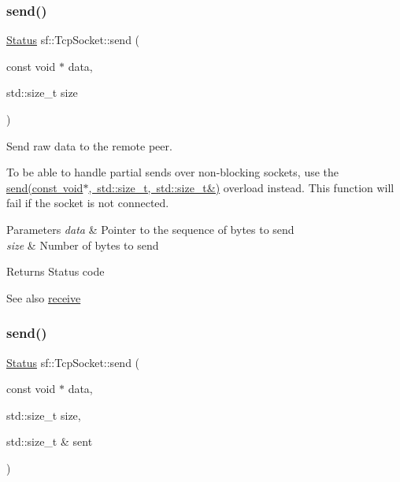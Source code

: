 \subsubsection{\texorpdfstring{send()}{send()}\hspace{0.1cm}{\footnotesize\ttfamily [1/3]}}
{\footnotesize\ttfamily \mbox{\hyperlink{classsf_1_1_socket_a51bf0fd51057b98a10fbb866246176dc}{Status}} sf\+::\+Tcp\+Socket\+::send (\begin{DoxyParamCaption}\item[{const void $\ast$}]{data,  }\item[{std\+::size\+\_\+t}]{size }\end{DoxyParamCaption})}



Send raw data to the remote peer. 

To be able to handle partial sends over non-\/blocking sockets, use the \mbox{\hyperlink{classsf_1_1_tcp_socket_a31f5b280126a96c6f3ad430f4cbcb54d}{send(const void$\ast$, std\+::size\+\_\+t, std\+::size\+\_\+t\&)}} overload instead. This function will fail if the socket is not connected.


\begin{DoxyParams}{Parameters}
{\em data} & Pointer to the sequence of bytes to send \\
\hline
{\em size} & Number of bytes to send\\
\hline
\end{DoxyParams}
\begin{DoxyReturn}{Returns}
Status code
\end{DoxyReturn}
\begin{DoxySeeAlso}{See also}
\mbox{\hyperlink{classsf_1_1_tcp_socket_a90ce50811ea61d4f00efc62bb99ae1af}{receive}} \begin{DoxyVerb}\end{DoxyVerb}
 
\end{DoxySeeAlso}
\mbox{\label{classsf_1_1_tcp_socket_a31f5b280126a96c6f3ad430f4cbcb54d}} 
\subsubsection{\texorpdfstring{send()}{send()}\hspace{0.1cm}{\footnotesize\ttfamily [2/3]}}
{\footnotesize\ttfamily \mbox{\hyperlink{classsf_1_1_socket_a51bf0fd51057b98a10fbb866246176dc}{Status}} sf\+::\+Tcp\+Socket\+::send (\begin{DoxyParamCaption}\item[{const void $\ast$}]{data,  }\item[{std\+::size\+\_\+t}]{size,  }\item[{std\+::size\+\_\+t \&}]{sent }\end{DoxyParamCaption})}



